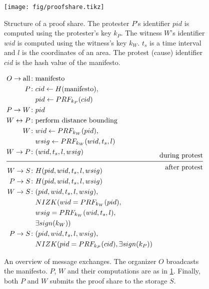 \begin{columns}[t]
\begin{column}{0.32\linewidth}
  \end{column}

  \hfill

  \begin{column}{0.32\linewidth}
    \begin{figure}
      \centering
      \texttt{[image: fig/proofshare.tikz]}
      \caption{%
        Structure of a proof share.
        The protester \(P\)'s identifier \(pid\) is computed using the protester's 
        key \(k_P\).
        The witness \(W\)'s identifier \(wid\) is computed using the witness's key 
        \(k_W\).
        \(t_s\) is a time interval and \(l\) is the coordinates of an area.
        The protest (cause) identifier \(cid\) is the hash value of the manifesto.
      }%
      \label{ProofShare}
    \end{figure}%

    \begin{figure}
      \centering
      \begin{minipage}{\linewidth}
        \begin{align*}
          O\to \text{all}\colon & \text{manifesto} \\
          P\colon & cid\gets H(\text{manifesto}), \\
          & pid\gets PRF_{k_P}(cid) \\
          P\to W\colon & pid \\
          W\leftrightarrow P\colon & \text{perform distance bounding} \\
          W\colon & wid\gets PRF_{k_W}(pid), \\
          & wsig\gets PRF_{k_W}(wid, t_s, l) \\
          W\to P\colon & (wid, t_s, l, wsig) \\[-1em]
          && \text{during protest} \\ \midrule && \text{after protest} \\[-1em]
          W\to S\colon & H(pid, wid, t_s, l, wsig) \\
          P\to S\colon & H(pid, wid, t_s, l, wsig) \\
          W\to S\colon & (pid, wid, t_s, l, wsig),\\
          & NIZK( wid = PRF_{k_W}(pid), \\
          & wsig = PRF_{k_W}(wid, t_s, l), \\
          & \exists sign(k_W)) \\
          P\to S\colon & (pid, wid, t_s, l, wsig),\\
          & NIZK(pid = PRF_{k_P}(cid), \exists sign(k_P))
        \end{align*}
      \end{minipage}
      \caption{%
        An overview of message exchanges.
        The organizer \(O\) broadcasts the manifesto.
        \(P\), \(W\) and their computations are as in \cref{ProofShare}.
        Finally, both \(P\) and \(W\) submits the proof share to the storage \(S\).
      }%
      \label{Protocol}
    \end{figure}



\end{column}
\end{columns}
